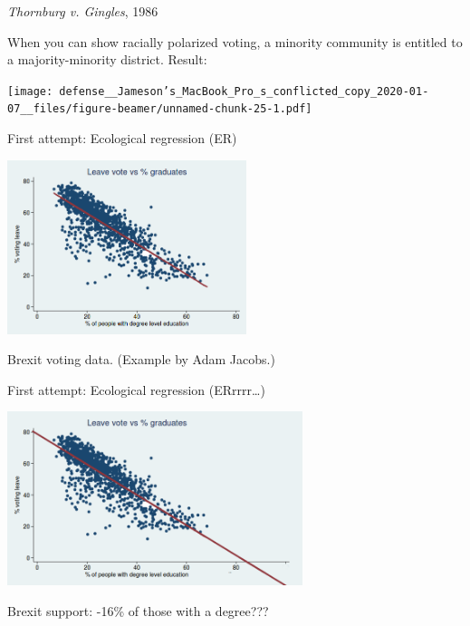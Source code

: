 \documentclass[
  ignorenonframetext,
]{beamer}
\begin{document}
\begin{frame}{\emph{Thornburg v. Gingles}, 1986}
\protect\hypertarget{thornburg-v.-gingles-1986}{}

When you can show racially polarized voting, a minority community is
entitled to a majority-minority district. Result:

\texttt{[image: defense\_\_Jameson’s\_MacBook\_Pro\_s\_conflicted\_copy\_2020-01-07\_\_files/figure-beamer/unnamed-chunk-25-1.pdf]}

\end{frame}

\begin{frame}{First attempt: Ecological regression (ER)}
\protect\hypertarget{first-attempt-ecological-regression-er}{}

\includegraphics[width=\textwidth,height=2in]{brexit_ER.png}

Brexit voting data. (Example by Adam Jacobs.)

\end{frame}

\begin{frame}{First attempt: Ecological regression (ERrrrr\ldots{})}
\protect\hypertarget{first-attempt-ecological-regression-errrrr}{}

\includegraphics[width=\textwidth,height=2in]{brexit_ER_oops.png}

Brexit support: -16\% of those with a degree???

\end{frame}
\end{document}
